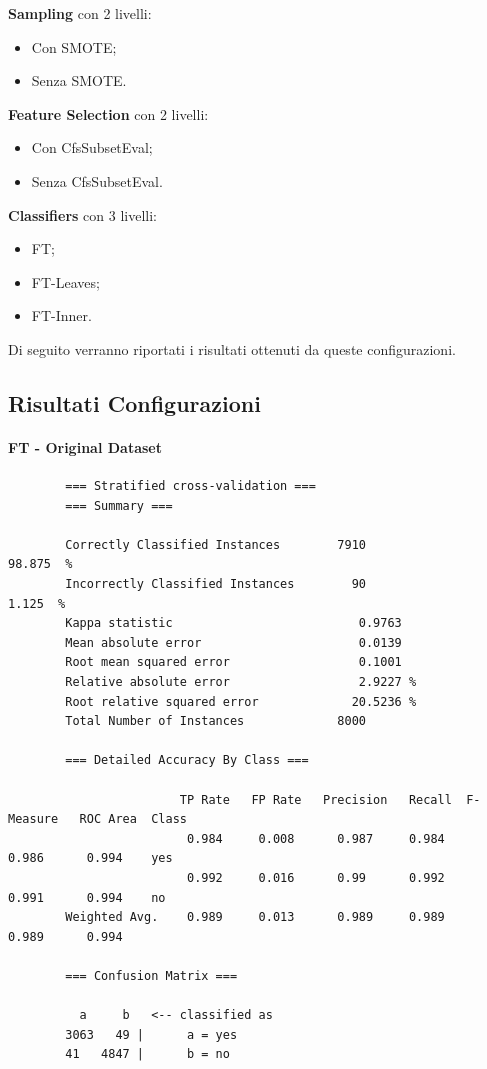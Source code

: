 \textbf{Sampling} con 2 livelli:
\begin{itemize}
	\item Con SMOTE;
	\item Senza SMOTE.
\end{itemize}
\textbf{Feature Selection} con 2 livelli:
\begin{itemize}
	\item Con CfsSubsetEval;
	\item Senza CfsSubsetEval.
\end{itemize}
\textbf{Classifiers} con 3 livelli:
\begin{itemize}
	\item FT;
	\item FT-Leaves;
	\item FT-Inner.
\end{itemize}
Di seguito verranno riportati i risultati ottenuti da queste configurazioni. 
\subsection{Risultati Configurazioni}
\paragraph{FT - Original Dataset}
{\footnotesize
	\begin{verbatim}
		=== Stratified cross-validation ===
		=== Summary ===
		
		Correctly Classified Instances        7910               98.875  %
		Incorrectly Classified Instances        90                1.125  %
		Kappa statistic                          0.9763
		Mean absolute error                      0.0139
		Root mean squared error                  0.1001
		Relative absolute error                  2.9227 %
		Root relative squared error             20.5236 %
		Total Number of Instances             8000     
		
		=== Detailed Accuracy By Class ===
		
		                TP Rate   FP Rate   Precision   Recall  F-Measure   ROC Area  Class
		                 0.984     0.008      0.987     0.984     0.986      0.994    yes
		                 0.992     0.016      0.99      0.992     0.991      0.994    no
		Weighted Avg.    0.989     0.013      0.989     0.989     0.989      0.994
		
		=== Confusion Matrix ===
		
		  a     b   <-- classified as
		3063   49 |      a = yes
		41   4847 |      b = no
	\end{verbatim}
}


